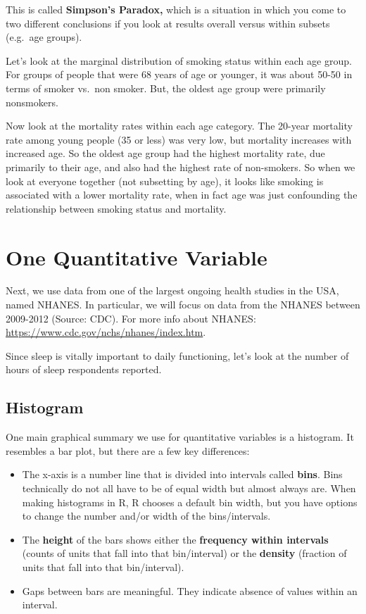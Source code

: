 \documentclass[
]{book}
\providecommand{\tightlist}{%
  \setlength{\itemsep}{0pt}\setlength{\parskip}{0pt}}
\begin{document}
This is called \textbf{Simpson's Paradox,} which is a situation in which you come to two different conclusions if you look at results overall versus within subsets (e.g.~age groups).

Let's look at the marginal distribution of smoking status within each age group. For groups of people that were 68 years of age or younger, it was about 50-50 in terms of smoker vs.~non smoker. But, the oldest age group were primarily nonsmokers.

Now look at the mortality rates within each age category. The 20-year mortality rate among young people (35 or less) was very low, but mortality increases with increased age. So the oldest age group had the highest mortality rate, due primarily to their age, and also had the highest rate of non-smokers. So when we look at everyone together (not subsetting by age), it looks like smoking is associated with a lower mortality rate, when in fact age was just confounding the relationship between smoking status and mortality.

\section{One Quantitative Variable}\label{one-quantitative-variable}

Next, we use data from one of the largest ongoing health studies in the USA, named NHANES. In particular, we will focus on data from the NHANES between 2009-2012 (Source: CDC). For more info about NHANES: \url{https://www.cdc.gov/nchs/nhanes/index.htm}.

Since sleep is vitally important to daily functioning, let's look at the number of hours of sleep respondents reported.

\subsection{Histogram}\label{histogram}

One main graphical summary we use for quantitative variables is a histogram. It resembles a bar plot, but there are a few key differences:

\begin{itemize}
\tightlist
\item
  The x-axis is a number line that is divided into intervals called \textbf{bins}. Bins technically do not all have to be of equal width but almost always are. When making histograms in R, R chooses a default bin width, but you have options to change the number and/or width of the bins/intervals.
\item
  The \textbf{height} of the bars shows either the \textbf{frequency within intervals} (counts of units that fall into that bin/interval) or the \textbf{density} (fraction of units that fall into that bin/interval).
\item
  Gaps between bars are meaningful. They indicate absence of values within an interval.
\end{itemize}
\end{document}
